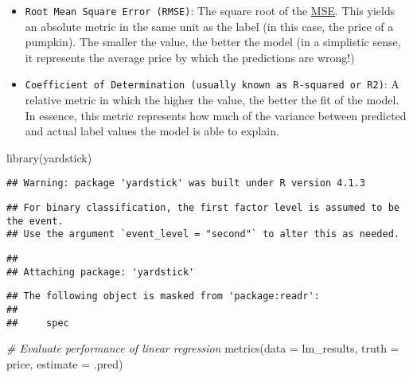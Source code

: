 \documentclass[
]{article}
\newenvironment{Shaded}{\begin{snugshade}}{\end{snugshade}}
\newcommand{\AttributeTok}[1]{\textcolor[rgb]{0.77,0.63,0.00}{#1}}
\newcommand{\CommentTok}[1]{\textcolor[rgb]{0.56,0.35,0.01}{\textit{#1}}}
\newcommand{\FunctionTok}[1]{\textcolor[rgb]{0.00,0.00,0.00}{#1}}
\newcommand{\NormalTok}[1]{#1}
\begin{document}
\begin{itemize}
\item
  \texttt{Root\ Mean\ Square\ Error\ (RMSE)}: The square root of the
  \href{https://en.wikipedia.org/wiki/Mean_squared_error}{MSE}. This
  yields an absolute metric in the same unit as the label (in this case,
  the price of a pumpkin). The smaller the value, the better the model
  (in a simplistic sense, it represents the average price by which the
  predictions are wrong!)
\item
  \texttt{Coefficient\ of\ Determination\ (usually\ known\ as\ R-squared\ or\ R2)}:
  A relative metric in which the higher the value, the better the fit of
  the model. In essence, this metric represents how much of the variance
  between predicted and actual label values the model is able to
  explain.
\end{itemize}

\begin{Shaded}
\begin{Highlighting}[]
\FunctionTok{library}\NormalTok{(yardstick)}
\end{Highlighting}
\end{Shaded}

\begin{verbatim}
## Warning: package 'yardstick' was built under R version 4.1.3
\end{verbatim}

\begin{verbatim}
## For binary classification, the first factor level is assumed to be the event.
## Use the argument `event_level = "second"` to alter this as needed.
\end{verbatim}

\begin{verbatim}
## 
## Attaching package: 'yardstick'
\end{verbatim}

\begin{verbatim}
## The following object is masked from 'package:readr':
## 
##     spec
\end{verbatim}

\begin{Shaded}
\begin{Highlighting}[]
\CommentTok{\# Evaluate performance of linear regression}
\FunctionTok{metrics}\NormalTok{(}\AttributeTok{data =}\NormalTok{ lm\_results,}
        \AttributeTok{truth =}\NormalTok{ price,}
        \AttributeTok{estimate =}\NormalTok{ .pred)}
\end{Highlighting}
\end{Shaded}
\end{document}
